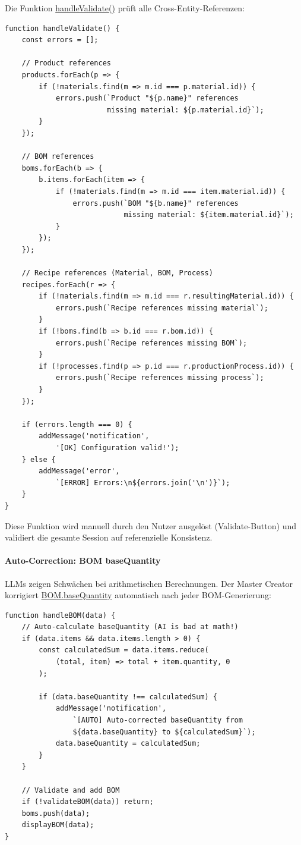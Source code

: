 Die Funktion \url{handleValidate()} prüft alle Cross-Entity-Referenzen:

\begin{verbatim}
function handleValidate() {
    const errors = [];

    // Product references
    products.forEach(p => {
        if (!materials.find(m => m.id === p.material.id)) {
            errors.push(`Product "${p.name}" references
                        missing material: ${p.material.id}`);
        }
    });

    // BOM references
    boms.forEach(b => {
        b.items.forEach(item => {
            if (!materials.find(m => m.id === item.material.id)) {
                errors.push(`BOM "${b.name}" references
                            missing material: ${item.material.id}`);
            }
        });
    });

    // Recipe references (Material, BOM, Process)
    recipes.forEach(r => {
        if (!materials.find(m => m.id === r.resultingMaterial.id)) {
            errors.push(`Recipe references missing material`);
        }
        if (!boms.find(b => b.id === r.bom.id)) {
            errors.push(`Recipe references missing BOM`);
        }
        if (!processes.find(p => p.id === r.productionProcess.id)) {
            errors.push(`Recipe references missing process`);
        }
    });

    if (errors.length === 0) {
        addMessage('notification',
            '[OK] Configuration valid!');
    } else {
        addMessage('error',
            `[ERROR] Errors:\n${errors.join('\n')}`);
    }
}
\end{verbatim}

\noindent Diese Funktion wird manuell durch den Nutzer ausgelöst (\glqq Validate\grqq{}-Button) und validiert die gesamte Session auf referenzielle Konsistenz.

\paragraph{Auto-Correction: BOM baseQuantity}

LLMs zeigen Schwächen bei arithmetischen Berechnungen. Der Master Creator korrigiert \url{BOM.baseQuantity} automatisch nach jeder BOM-Generierung:

\begin{verbatim}
function handleBOM(data) {
    // Auto-calculate baseQuantity (AI is bad at math!)
    if (data.items && data.items.length > 0) {
        const calculatedSum = data.items.reduce(
            (total, item) => total + item.quantity, 0
        );

        if (data.baseQuantity !== calculatedSum) {
            addMessage('notification',
                `[AUTO] Auto-corrected baseQuantity from
                ${data.baseQuantity} to ${calculatedSum}`);
            data.baseQuantity = calculatedSum;
        }
    }

    // Validate and add BOM
    if (!validateBOM(data)) return;
    boms.push(data);
    displayBOM(data);
}
\end{verbatim}

